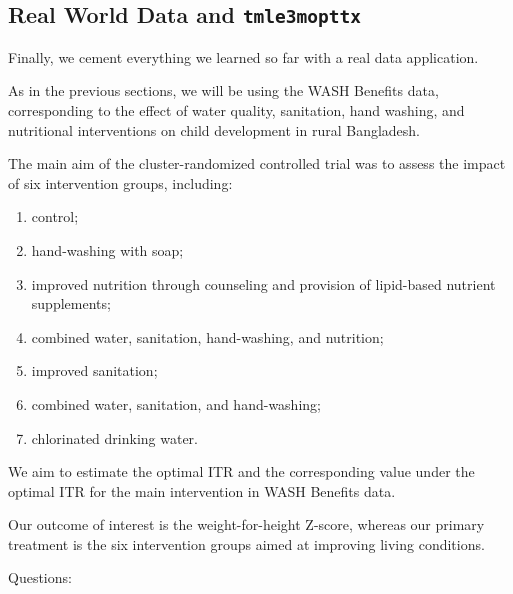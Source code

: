 \documentclass[12pt, krantz2,]{book}
\theoremstyle{definition}
\theoremstyle{definition}
\theoremstyle{definition}
\newcommand{\1}{\mathbbm{1}}
\begin{document}
\hypertarget{real-world-data-and-tmle3mopttx}{%
\subsection{\texorpdfstring{Real World Data and \texttt{tmle3mopttx}}{Real World Data and tmle3mopttx}}\label{real-world-data-and-tmle3mopttx}}

Finally, we cement everything we learned so far with a real data application.

As in the previous sections, we will be using the WASH Benefits data,
corresponding to the effect of water quality, sanitation, hand washing, and
nutritional interventions on child development in rural Bangladesh.

The main aim of the cluster-randomized controlled trial was to assess the
impact of six intervention groups, including:

\begin{enumerate}
\def\labelenumi{\arabic{enumi}.}
\item
  control;
\item
  hand-washing with soap;
\item
  improved nutrition through counseling and provision of lipid-based nutrient
  supplements;
\item
  combined water, sanitation, hand-washing, and nutrition;
\item
  improved sanitation;
\item
  combined water, sanitation, and hand-washing;
\item
  chlorinated drinking water.
\end{enumerate}

We aim to estimate the optimal ITR and the corresponding value under the optimal
ITR for the main intervention in WASH Benefits data.

Our outcome of interest is the weight-for-height Z-score, whereas our primary
treatment is the six intervention groups aimed at improving living conditions.

Questions:
\end{document}

